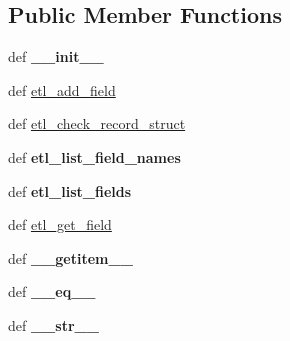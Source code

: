 \subsection*{Public Member Functions}
\begin{DoxyCompactItemize}
\item 
\hypertarget{classetl_1_1schema_1_1EtlSchema_1_1EtlSchema_ab7ab47ea64b7bd9030be721817da188c}{def {\bfseries \-\_\-\-\_\-init\-\_\-\-\_\-}}\label{classetl_1_1schema_1_1EtlSchema_1_1EtlSchema_ab7ab47ea64b7bd9030be721817da188c}

\item 
def \hyperlink{classetl_1_1schema_1_1EtlSchema_1_1EtlSchema_a689a98225755a0a2d65ac0015fabf2ee}{etl\-\_\-add\-\_\-field}
\item 
def \hyperlink{classetl_1_1schema_1_1EtlSchema_1_1EtlSchema_a18260552765b7f1eea45d12dab3eac70}{etl\-\_\-check\-\_\-record\-\_\-struct}
\item 
\hypertarget{classetl_1_1schema_1_1EtlSchema_1_1EtlSchema_a8c7059074731b52197d9574b21685fbe}{def {\bfseries etl\-\_\-list\-\_\-field\-\_\-names}}\label{classetl_1_1schema_1_1EtlSchema_1_1EtlSchema_a8c7059074731b52197d9574b21685fbe}

\item 
\hypertarget{classetl_1_1schema_1_1EtlSchema_1_1EtlSchema_a34e22026a19927cc8dfce59e62d4a343}{def {\bfseries etl\-\_\-list\-\_\-fields}}\label{classetl_1_1schema_1_1EtlSchema_1_1EtlSchema_a34e22026a19927cc8dfce59e62d4a343}

\item 
def \hyperlink{classetl_1_1schema_1_1EtlSchema_1_1EtlSchema_a5563f88b44d362bf39bab48a676188d1}{etl\-\_\-get\-\_\-field}
\item 
\hypertarget{classetl_1_1schema_1_1EtlSchema_1_1EtlSchema_ae9e1060ef06f9d36eca29b8658a31788}{def {\bfseries \-\_\-\-\_\-getitem\-\_\-\-\_\-}}\label{classetl_1_1schema_1_1EtlSchema_1_1EtlSchema_ae9e1060ef06f9d36eca29b8658a31788}

\item 
\hypertarget{classetl_1_1schema_1_1EtlSchema_1_1EtlSchema_af7c64e28f6d7c1c811dece2062797127}{def {\bfseries \-\_\-\-\_\-eq\-\_\-\-\_\-}}\label{classetl_1_1schema_1_1EtlSchema_1_1EtlSchema_af7c64e28f6d7c1c811dece2062797127}

\item 
\hypertarget{classetl_1_1schema_1_1EtlSchema_1_1EtlSchema_a98cd9c88bc62e5e3ee134accf1bbf863}{def {\bfseries \-\_\-\-\_\-str\-\_\-\-\_\-}}\label{classetl_1_1schema_1_1EtlSchema_1_1EtlSchema_a98cd9c88bc62e5e3ee134accf1bbf863}

\end{DoxyCompactItemize}
